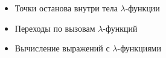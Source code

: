 \begin{frame}
\frametitle{\insertsection} 
\framesubtitle{\insertsubsection}
\begin{itemize}
	\item Точки останова внутри тела $\lambda$-функции
	\item Переходы по вызовам $\lambda$-функций
	\item Вычисление выражений с $\lambda$-функциями
\end{itemize}
\end{frame}
